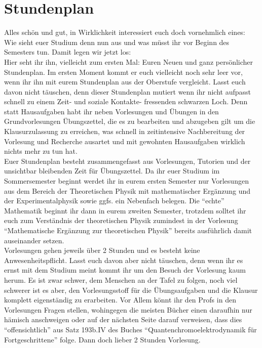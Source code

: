 \section{Stundenplan}
\label{sec:stundenplan}
Alles schön und gut, in Wirklichkeit interessiert euch doch vornehmlich eines: Wie sieht euer Studium denn nun aus und was müsst ihr vor Beginn des Semesters tun. Damit legen wir jetzt los:\\
Hier seht ihr ihn, vielleicht zum ersten Mal: Euren Neuen und ganz persönlicher Stundenplan. Im ersten Moment kommt er euch vielleicht noch sehr leer vor, wenn ihr ihn mit eurem Stundenplan aus der Oberstufe vergleicht.
Lasst euch davon nicht täuschen, denn dieser Stundenplan mutiert wenn ihr nicht aufpasst schnell zu einem Zeit- und soziale Kontakte- fressenden schwarzen Loch. Denn statt Hausaufgaben habt ihr neben Vorlesungen und Übungen in den Grundvorlesungen Übungszettel, die es zu bearbeiten und abzugeben gilt um die Klausurzulassung zu erreichen, was schnell in zeitintensive Nachbereitung der Vorlesung und Recherche ausartet und mit gewohnten Hausaufgaben wirklich nichts mehr zu tun hat.\\
Euer Stundenplan besteht zusammengefasst aus Vorlesungen, Tutorien und der unsichtbar bleibenden Zeit für Übungszettel.
Da ihr euer Studium im Sommersemester beginnt werdet ihr in eurem ersten Semester nur Vorlesungen aus dem Bereich der Theoretischen Physik mit mathematischer Ergänzung und der Experimentalphysik sowie ggfs. ein Nebenfach belegen. Die \enquote{echte} Mathematik beginnt ihr dann in eurem zweiten Semester, trotzdem solltet ihr euch zum Verständnis der theoretischen Physik zumindest in der Vorlesung \enquote{Mathematische Ergänzung zur theoretischen Physik} bereits ausführlich damit auseinander setzen.\\
Vorlesungen gehen jeweils über 2 Stunden und es besteht keine Anwesenheitspflicht. Lasst euch davon aber nicht täuschen, denn wenn ihr es ernst mit dem Studium meint kommt ihr um den Besuch der Vorlesung kaum herum. Es ist zwar schwer, dem Menschen an der Tafel zu folgen, noch viel schwerer ist es aber, den Vorlesungsstoff für die Übungsaufgaben und die Klausur komplett eigenständig zu erarbeiten. Vor Allem könnt ihr den Profs in den Vorlesungen Fragen stellen, wohingegen die meisten Bücher einen daraufhin nur hämisch anschweigen oder auf der nächsten Seite darauf verweisen, dass dies \enquote{offensichtlich} aus Satz 193b.IV des Buches \enquote{Quantenchromoelektrodynamik für Fortgeschrittene} folge. Dann doch lieber 2 Stunden Vorlesung.\\
